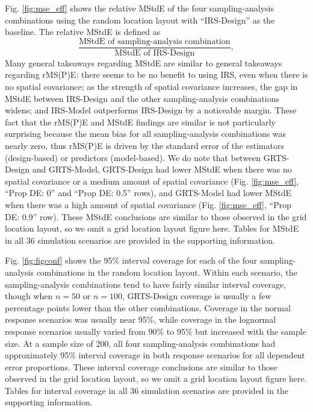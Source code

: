 \documentclass[]{elsarticle} %
\begin{document}
Fig. \ref{fig:mse_eff} shows the relative MStdE of the four
sampling-analysis combinations using the random location layout with
``IRS-Design'' as the baseline. The relative MStdE is defined as
\begin{equation*}
\frac{\text{MStdE of sampling-analysis combination}}{\text{MStdE of IRS-Design}},
\end{equation*} Many general takeaways regarding MStdE are similar to
general takeaways regarding rMS(P)E: there seems to be no benefit to
using IRS, even when there is no spatial covariance; as the strength of
spatial covariance increases, the gap in MStdE between IRS-Design and
the other sampling-analysis combinations widens; and IRS-Model
outperforms IRS-Design by a noticeable margin. These fact that the
rMS(P)E and MStdE findings are similar is not particularly surprising
because the mean bias for all sampling-analysis combinations was nearly
zero, thus rMS(P)E is driven by the standard error of the estimators
(design-based) or predictors (model-based). We do note that between
GRTS-Design and GRTS-Model, GRTS-Design had lower MStdE when there was
no spatial covariance or a medium amount of spatial covariance (Fig.
\ref{fig:mse_eff}, ``Prop DE: 0'' and ``Prop DE: 0.5'' rows), and
GRTS-Model had lower MStdE when there was a high amount of spatial
covariance (Fig. \ref{fig:mse_eff}, ``Prop DE: 0.9'' row). These MStdE
conclusions are similar to those observed in the grid location layout,
so we omit a grid location layout figure here. Tables for MStdE in all
36 simulation scenarios are provided in the supporting information.

Fig. \ref{fig:figconf} shows the 95\% interval coverage for each of the
four sampling-analysis combinations in the random location layout.
Within each scenario, the sampling-analysis combinations tend to have
fairly similar interval coverage, though when \(n = 50\) or \(n = 100\),
GRTS-Design coverage is usually a few percentage points lower than the
other combinations. Coverage in the normal response scenarios was
usually near 95\%, while coverage in the lognormal response scenarios
usually varied from 90\% to 95\% but increased with the sample size. At
a sample size of 200, all four sampling-analysis combinations had
approximately 95\% interval coverage in both response scenarios for all
dependent error proportions. These interval coverage conclusions are
similar to those observed in the grid location layout, so we omit a grid
location layout figure here. Tables for interval coverage in all 36
simulation scenarios are provided in the supporting information.
\end{document}
